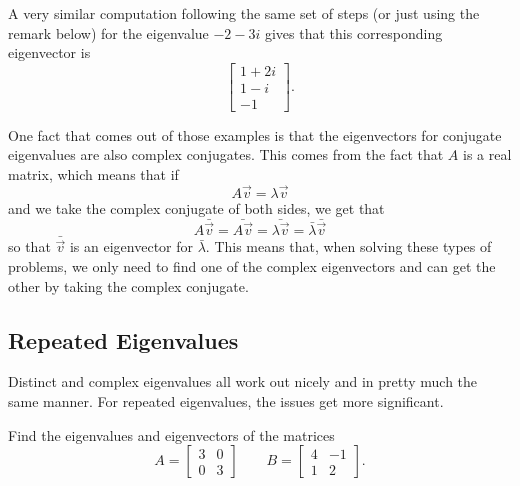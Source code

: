 \documentclass{ximera}
\begin{document}
\begin{exampleSol}
    A very similar computation following the same set of steps (or just using the remark below) for the eigenvalue $-2-3i$ gives that this corresponding eigenvector is 
    \[ 
        \begin{bmatrix} 
            1 + 2i \\ 
            1-i \\ 
            -1 
        \end{bmatrix}. 
    \]

\end{exampleSol}

One fact that comes out of those examples is that the eigenvectors for conjugate eigenvalues are also complex conjugates. This comes from the fact that $A$ is a real matrix, which means that if
\[ 
    A\vec{v} = \lambda \vec{v} 
\] 
and we take the complex conjugate of both sides, we get that
\[ 
    A\bar{\vec{v}} = \bar{A\vec{v}} = \bar{\lambda\vec{v}} = \bar{\lambda}\bar{\vec{v}} 
\] 
so that $\bar{\vec{v}}$ is an eigenvector for $\bar{\lambda}$. This means that, when solving these types of problems, we only need to find one of the complex eigenvectors and can get the other by taking the complex conjugate. 

\subsection{Repeated Eigenvalues}

Distinct and complex eigenvalues all work out nicely and in pretty much the same manner. For repeated eigenvalues, the issues get more significant. 

\begin{example}
    Find the eigenvalues and eigenvectors of the matrices
    \[ 
        A = 
        \begin{bmatrix} 
            3 & 0 \\ 
            0 & 3 
        \end{bmatrix} 
        \qquad B = 
        \begin{bmatrix} 
            4 & -1 \\ 
            1 & 2 
        \end{bmatrix}.
    \]
\end{example}
\end{document}
